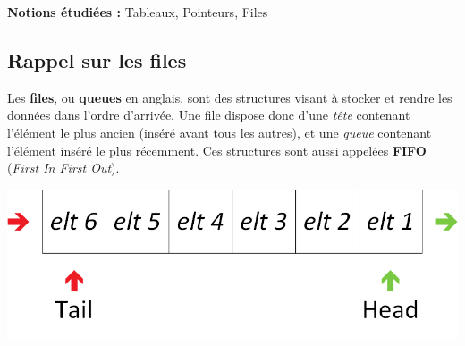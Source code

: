 \newcommand{\defaultparindent}{\parindent}
\setlength{\parindent}{0pt}				%




\textbf{Notions étudiées :} Tableaux, Pointeurs, Files\\


\subsection{Rappel sur les files}

\bigskip

Les \textbf{files}, ou \textbf{queues} en anglais, sont des structures visant à stocker et rendre les données dans l'ordre d'arrivée.
Une file dispose donc d'une \textit{tête} contenant l'élément le plus ancien (inséré avant tous les autres), et une \textit{queue} contenant l'élément inséré le plus récemment.
Ces structures sont aussi appelées \textbf{FIFO} (\textit{First In First Out}).\\

\begin{center}
\includegraphics[scale=0.75]{Cours/Files_1_Structure_Generale.png}
\end{center}


